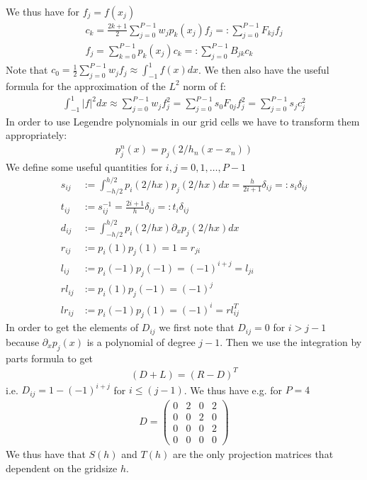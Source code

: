 \documentclass[a4paper,12pt]{scrartcl}
\begin{document}
We thus have for $f_j = f(x_j)$
\begin{subequations}
\begin{align}
    c_k = \frac{2k+1}{2}\sum_{j=0}^{P-1}w_j p_k(x_j) f_j =: \sum_{j=0}^{P-1} F_{kj}f_j\\
    f_j = \sum_{k=0}^{P-1} p_k(x_j) c_k =: \sum_{j=0}^{P-1} B_{jk}c_k
\end{align}
\end{subequations}
Note that $c_0 = \frac{1}{2}\sum_{j=0}^{P-1} w_j f_j \approx \int_{-1}^1 f(x)dx$.
We then also have the useful formula for the approximation of the $L^2$ norm of f:
\begin{align}
   \int_{-1}^1 |f|^2 dx \approx \sum_{j=0}^{P-1} w_jf_j^2 = \sum_{j=0}^{P-1}s_0 F_{0j}f_j^2 = \sum_{j=0}^{P-1} s_jc_j^2  
    \label{}
\end{align}
In order to use Legendre polynomials in our grid cells we have to transform them 
appropriately:
\begin{align}
    p^n_j(x) = p_j( 2/h_n(x-x_n))
    \label{}
\end{align}
We define some useful quantities for $i,j=0,1,\dots,P-1$
\begin{subequations}
    \begin{align}
        s_{ij} &:= \int_{-h/2}^{h/2} p_i(2/h x)p_j(2/h x) dx = \frac{h}{2i+1}\delta_{ij} =: s_i \delta_{ij}\\ 
        t_{ij} &:= s^{-1}_{ij} = \frac{2i+1}{h}\delta_{ij} =: t_i \delta_{ij}\\
        d_{ij} &:= \int_{-h/2}^{h/2} p_i(2/h x)\partial_xp_j(2/h x) dx\\
        r_{ij} &:= p_i(1)p_j(1) = 1 = r_{ji}\\
        l_{ij} &:= p_i(-1)p_j(-1) = (-1)^{i+j} = l_{ji}\\
        rl_{ij}&:= p_i(1)p_j(-1) = (-1)^j\\
        lr_{ij}&:= p_i(-1)p_j(1) = (-1)^i = rl^T_{ij}
        \label{eq:legendre_operators}
    \end{align}
\end{subequations}
In order to get the elements of $D_{ij}$ we first note that $D_{ij} = 0$ for
$i > j-1$ because $\partial_x p_j(x)$ is a polynomial of degree $j-1$. Then
we use the integration by parts formula to get
\begin{align}
    (D+L) = (R-D)^T
    \label{eq:legendre_derivative}
\end{align}
i.e. $D_{ij} = 1 - (-1)^{i+j}$ for $i\le (j-1)$. We thus have e.g. for $P=4$
\begin{align}
    D = \begin{pmatrix}
        0 & 2 & 0 & 2 \\
        0 & 0 & 2 & 0 \\
        0 & 0 & 0 & 2 \\
        0 & 0 & 0 & 0 
    \end{pmatrix}
    \label{eq:example_derivative}
\end{align}
We thus have that $S(h)$ and $T(h)$ are the only projection matrices that dependent on the gridsize $h$.
\end{document}
